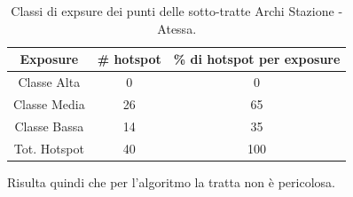 \begin{table}[H]
	\centering
	\begin{tabular}{|c|c|c|}
		\hline
		\rowcolor[HTML]{C0C0C0} 
		\textbf{Exposure} & \textbf{\# hotspot} & \textbf{\% di hotspot per exposure} \\ \hline
		Classe Alta       & 0                  & 0                                  \\ \hline
		Classe Media      & 26                 & 65                        \\ \hline
		Classe Bassa      & 14              & 35                            \\ \hline
		Tot. Hotspot      & 40               & 100                                 \\ \hline
	\end{tabular}
	\caption{Classi di expsure dei punti delle sotto-tratte Archi Stazione - Atessa.}
	\label{risultati_archi_atessa}
\end{table}

Risulta quindi che per l'algoritmo la tratta non è pericolosa. 
